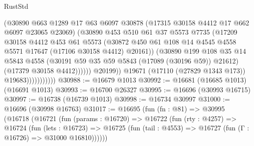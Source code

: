 \begin{lexlean}{RustStd}
\begin{coremodule}
                                  (@30890
                                    @663
                                    @1289
                                    @17
                                    @63
                                    @6097
                                    @30878
                                    (@17315 @30158 @4412 @17 @662 @6097 @23065 @23069)
                                    (@30890
                                      @453
                                      @510
                                      @61
                                      @37
                                      @5573
                                      @7735
                                      (@17209
                                        @30158
                                        @4412
                                        @453
                                        @61
                                        @5573
                                        (@30872
                                          @450
                                          @61
                                          @108
                                          @14
                                          @4545
                                          @4558
                                          @5571
                                          @17647
                                          (@17106 @30158 @4412)
                                          @20161))
                                      (@30890
                                        @199
                                        @108
                                        @35
                                        @14
                                        @5843
                                        @4558
                                        (@30191 @59 @35 @59 @5843 (@17089 (@30196 @59)) @21612)
                                        (@17379 @30158 @4412))))))
                              @20199))
                          @19671
                          (@17110 (@27829 @1343 @173))
                          @19683)))))))))))
@30988 := @16679 @1013
@30992 := @16681 (@16685 @1013) (@16691 @1013)
@30993 := @16700 @26327
@30995 := @16696 (@30993 @16715)
@30997 := @16738 (@16739 @1013)
@30998 := @16734 @30997
@31000 := @16696 (@30998 @16763)
@31017 := @16695
    (fun (fn : @81) =>
    @30995
      (@16718
        (@16721
          (fun (params : @16720) =>
          @16722
            (fun (rty : @4257) =>
            @16724
              (fun (lets : @16723) =>
              @16725 (fun (tail : @4553) => @16727 (fun (Γ : @16726) => @31000 @16810))))))

\end{coremodule}
\end{lexlean}
